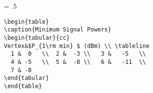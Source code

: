 \newpage
\baselineskip = .5\baselineskip  %
\begin{verbatim}
\begin{table}
\caption{Minimum Signal Powers}
\begin{tabular}{cc}
Vertex&$P_{1\rm min} $ (dBm) \\ \tableline
  1 &  0   \\  2 &  -3 \\   3 &   -5   \\
  4 & -5   \\  5 &  -8 \\   6 &   -11  \\
  7 & -8
\end{tabular}
\end{table}


\end{verbatim}


